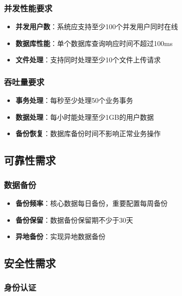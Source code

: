 \documentclass[a4paper]{article}
\begin{document}
\subsubsection{并发性能要求}

\begin{itemize}
    \item \textbf{并发用户数}：系统应支持至少100个并发用户同时在线
    \item \textbf{数据库性能}：单个数据库查询响应时间不超过100ms
    \item \textbf{文件处理}：支持同时处理至少10个文件上传请求
\end{itemize}

\subsubsection{吞吐量要求}

\begin{itemize}
    \item \textbf{事务处理}：每秒至少处理50个业务事务
    \item \textbf{数据处理}：每小时能处理至少1GB的用户数据
    \item \textbf{备份恢复}：数据库备份时间不影响正常业务操作
\end{itemize}

\subsection{可靠性需求}

\subsubsection{数据备份}

\begin{itemize}
    \item \textbf{备份频率}：核心数据每日备份，重要配置每周备份
    \item \textbf{备份保留}：数据备份保留期不少于30天
    \item \textbf{异地备份}：实现异地数据备份
\end{itemize}

\subsection{安全性需求}

\subsubsection{身份认证}
\end{document}

